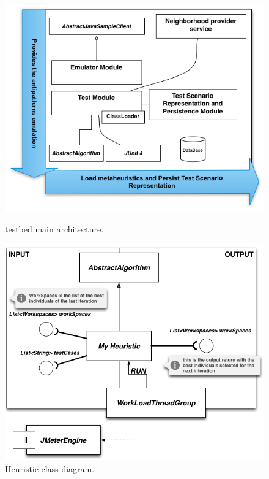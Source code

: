 \documentclass[times]{stvrauth}
\begin{document}
\begin{figure}[H]
\begin{minipage}{.5\textwidth}
\centering
\includegraphics[width=1\textwidth]{./images/testbedarch.png}
\caption{testbed main architecture.}
\label{fig:testbedarch}
\end{minipage}
\begin{minipage}{.5\textwidth}
\centering
\includegraphics[width=1\textwidth]{./images/myheuristic.png}
\caption{Heuristic class diagram.}
\label{fig:heuristicclassdiagram}
\end{minipage}
\end{figure} 
\end{document}

